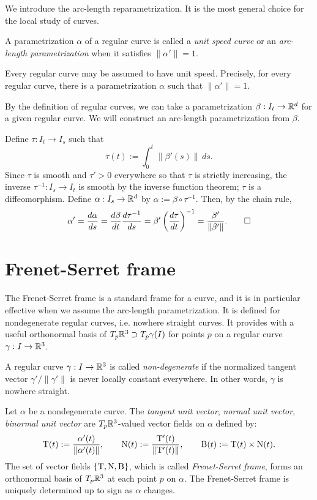 \documentclass{../note}
\def\a{\alpha}
\begin{document}
We introduce the arc-length reparametrization.
It is the most general choice for the local study of curves.
\begin{defn}
A parametrization $\a$ of a regular curve is called a \emph{unit speed curve} or an \emph{arc-length parametrization} when it satisfies $\|\a'\|=1$.
\end{defn}
\begin{thm}
Every regular curve may be assumed to have unit speed.
Precisely, for every regular curve, there is a parametrization $\a$ such that $\|\a'\|=1$.
\end{thm}
\begin{pf}
By the definition of regular curves, we can take a parametrization $\beta:I_t\to\mathbb{R}^d$ for a given regular curve.
We will construct an arc-length parametrization from $\beta$.

Define $\tau:I_t\to I_s$ such that
\[\tau(t):=\int_0^t\|\beta'(s)\|\,ds.\]
Since $\tau$ is smooth and $\tau'>0$ everywhere so that $\tau$ is strictly increasing, the inverse $\tau^{-1}:I_s\to I_t$ is smooth by the inverse function theorem; $\tau$ is a diffeomorphism.
Define $\a:I_s\to\R^d$ by $\a:=\beta\circ\tau^{-1}$.
Then, by the chain rule,
\[\a'=\dd{\a}{s}=\dd{\beta}{t}\dd{\tau^{-1}}{s}=\beta'\left(\dd{\tau}{t}\right)^{-1}=\frac{\beta'}{\|\beta'\|}.\qedhere\]
\end{pf}




\section{Frenet-Serret frame}

The Frenet-Serret frame is a standard frame for a curve, and it is in particular effective when we assume the arc-length parametrization.
It is defined for nondegenerate regular curves, i.e. nowhere straight curves.
It provides with a useful orthonormal basis of $T_p\mathbb{R}^3\supset T_p\gamma(I)$ for points $p$ on a regular curve $\gamma:I\to\mathbb{R}^3$.
\begin{prb}
A regular curve $\gamma:I\to\mathbb{R}^3$ is called \emph{non-degenerate} if the normalized tangent vector $\gamma'/\|\gamma'\|$ is never locally constant everywhere.
In other words, $\gamma$ is nowhere straight.
\end{prb}

\begin{defn}
Let $\a$ be a nondegenerate curve.
The \emph{tangent unit vector}, \emph{normal unit vector}, \emph{binormal unit vector} are $T_p\mathbb{R}^3$-valued vector fields on $\a$ defined by:
\[\rT(t):=\frac{\a'(t)}{\|\a'(t)\|},\qquad\rN(t):=\frac{\rT'(t)}{\|\rT'(t)\|},\qquad\rB(t):=\rT(t)\times\rN(t).\]
The set of vector fields $\{\mathrm{T},\mathrm{N},\mathrm{B}\}$, which is called \emph{Frenet-Serret frame}, forms an orthonormal basis of $T_p\mathbb{R}^3$ at each point $p$ on $\a$.
The Frenet-Serret frame is uniquely determined up to sign as $\a$ changes.
\end{defn}
\end{document}
